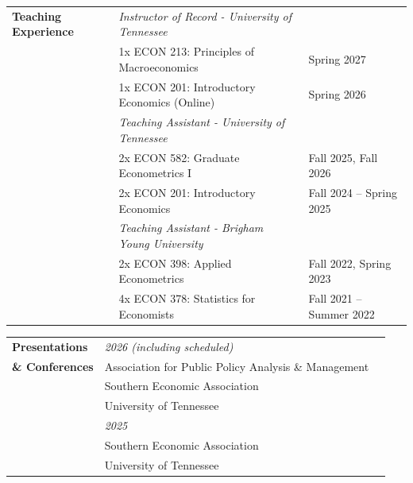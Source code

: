 \documentclass[11pt]{article}
\begin{document}
    \noindent
    \begin{tabularx}{\textwidth}{@{} p{3.75cm} X >{\raggedleft\arraybackslash}p{4.5cm} @{}}
        \textbf{Teaching Experience}
        & \textit{Instructor of Record - \textcolor{UTorange}{University of Tennessee}} & \\
        & 1x ECON 213: Principles of Macroeconomics & Spring 2027   \\
        & 1x ECON 201: Introductory Economics (Online) & Spring 2026  \\[6pt]

        & \textit{Teaching Assistant - \textcolor{UTorange}{University of Tennessee}} & \\
        & 2x ECON 582: Graduate Econometrics I & Fall 2025, Fall 2026 \\
        & 2x ECON 201: Introductory Economics & Fall 2024 -- Spring 2025 \\[6pt]

        & \textit{Teaching Assistant - \textcolor{BYUnavy}{Brigham Young University}} & \\
        & 2x ECON 398: Applied Econometrics & Fall 2022, Spring 2023 \\
        & 4x ECON 378: Statistics for Economists & Fall 2021 -- Summer 2022 \\
    \end{tabularx}

    \vspace{0.4cm}


    \noindent
    \begin{tabularx}{\textwidth}{@{} p{3.75cm} X >{\raggedleft \arraybackslash}p{3.5cm} @{}}
        \textbf{Presentations}
        & \textit{2026 (including scheduled)} & \\
        \textbf{\& Conferences}
        & Association for Public Policy Analysis \& Management & \\
        & Southern Economic Association & \\
        & University of Tennessee & \\[6pt]
        & \textit{2025} & \\
        & Southern Economic Association & \\
        & University of Tennessee & \\
    \end{tabularx}
\end{document}
